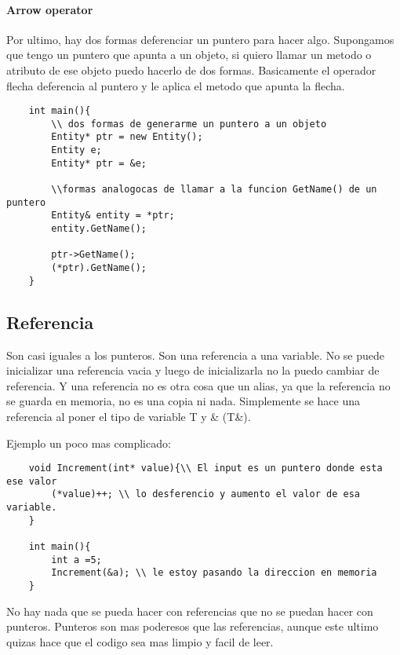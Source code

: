 \documentclass[11pt]{article}
\begin{document}
\paragraph{Arrow operator}
Por ultimo, hay dos formas deferenciar un puntero para hacer algo.
Supongamos que tengo un puntero que apunta a un objeto,
si quiero llamar un metodo o atributo de ese objeto puedo hacerlo de dos formas.
Basicamente el operador flecha deferencia al puntero y le aplica el metodo
que apunta la flecha.

\begin{lstlisting}
    int main(){
        \\ dos formas de generarme un puntero a un objeto
        Entity* ptr = new Entity();
        Entity e;
        Entity* ptr = &e;

        \\formas analogocas de llamar a la funcion GetName() de un puntero
        Entity& entity = *ptr;
        entity.GetName();

        ptr->GetName();
        (*ptr).GetName();
    }
\end{lstlisting}



\subsection{Referencia}
Son casi iguales a los punteros.
Son una referencia a una variable.
No se puede inicializar una referencia vacia y luego de inicializarla no la puedo
cambiar de referencia.
Y una referencia no es otra cosa que un alias, ya que la referencia no se guarda
en memoria, no es una copia ni nada.
Simplemente se hace una referencia al poner el tipo de variable T y \& (T\&).

Ejemplo un poco mas complicado:
\begin{lstlisting}
    void Increment(int* value){\\ El input es un puntero donde esta ese valor
        (*value)++; \\ lo desferencio y aumento el valor de esa variable.
    }

    int main(){
        int a =5;
        Increment(&a); \\ le estoy pasando la direccion en memoria
    }
\end{lstlisting}

No hay nada que se pueda hacer con referencias que no se puedan hacer con punteros.
Punteros son mas poderesos que las referencias, aunque este ultimo quizas hace
que el codigo sea mas limpio y facil de leer.
\end{document}
